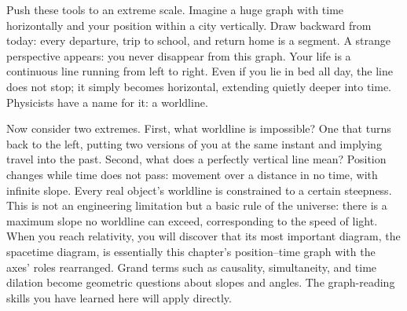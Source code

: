 
\begin{thought}
Push these tools to an extreme scale. Imagine a huge graph with time horizontally and your position within a city vertically. Draw backward from today: every departure, trip to school, and return home is a segment. A strange perspective appears: you never disappear from this graph. Your life is a continuous line running from left to right. Even if you lie in bed all day, the line does not stop; it simply becomes horizontal, extending quietly deeper into time. Physicists have a name for it: a worldline.

Now consider two extremes. First, what worldline is impossible? One that turns back to the left, putting two versions of you at the same instant and implying travel into the past. Second, what does a perfectly vertical line mean? Position changes while time does not pass: movement over a distance in no time, with infinite slope. Every real object's worldline is constrained to a certain steepness. This is not an engineering limitation but a basic rule of the universe: there is a maximum slope no worldline can exceed, corresponding to the speed of light. When you reach relativity, you will discover that its most important diagram, the spacetime diagram, is essentially this chapter's position--time graph with the axes' roles rearranged. Grand terms such as causality, simultaneity, and time dilation become geometric questions about slopes and angles. The graph-reading skills you have learned here will apply directly.
\end{thought}

